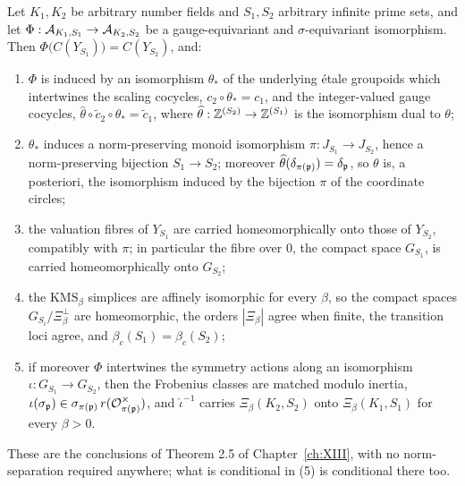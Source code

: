 \begin{theorem}\label{XIV:thm:uncond}
Let $K_1,K_2$ be arbitrary number fields and $S_1,S_2$ arbitrary infinite prime sets, and
let $\Phi:\mathcal{A}_{K_1,S_1}\to\mathcal{A}_{K_2,S_2}$ be a gauge-equivariant and $\sigma$-equivariant
isomorphism. Then $\Phi\bigl(C(Y_{S_1})\bigr)=C(Y_{S_2})$, and:
\begin{enumerate}
\item $\Phi$ is induced by an isomorphism $\theta_*$ of the underlying \'etale groupoids
which intertwines the scaling cocycles, $c_2\circ\theta_*=c_1$, and the integer-valued
gauge cocycles, $\widehat\theta\circ\widetilde c_2\circ\theta_*=\widetilde c_1$, where
$\widehat\theta:\mathbb{Z}^{(S_2)}\to\mathbb{Z}^{(S_1)}$ is the isomorphism dual to $\theta$;
\item $\theta_*$ induces a norm-preserving monoid isomorphism $\pi:J_{S_1}\to J_{S_2}$,
hence a norm-preserving bijection $S_1\to S_2$; moreover
$\widehat\theta(\delta_{\pi(\mathfrak{p})})=\delta_{\mathfrak{p}}$, so $\theta$ is, a posteriori, the
isomorphism induced by the bijection $\pi$ of the coordinate circles;
\item the valuation fibres of $Y_{S_1}$ are carried homeomorphically onto those of
$Y_{S_2}$, compatibly with $\pi$; in particular the fibre over $0$, the compact space
$G_{S_1}$, is carried homeomorphically onto $G_{S_2}$;
\item the $\mathrm{KMS}_\beta$ simplices are affinely isomorphic for every $\beta$, so the
compact spaces $G_{S_i}/\Xi_\beta^\perp$ are homeomorphic, the orders $|\Xi_\beta|$ agree
when finite, the transition loci agree, and $\beta_c(S_1)=\beta_c(S_2)$;
\item if moreover $\Phi$ intertwines the symmetry actions along an isomorphism
$\iota:G_{S_1}\to G_{S_2}$, then the Frobenius classes are matched modulo inertia,
$\iota(\sigma_{\mathfrak{p}})\in\sigma_{\pi(\mathfrak{p})}\,r(\mathcal{O}_{\pi(\mathfrak{p})}^\times)$, and $\hat\iota^{-1}$
carries $\Xi_\beta(K_2,S_2)$ onto $\Xi_\beta(K_1,S_1)$ for every $\beta>0$.
\end{enumerate}
These are the conclusions of Theorem 2.5 of Chapter~\ref{ch:XIII}, with no norm-separation required
anywhere; what is conditional in (5) is conditional there too.
\end{theorem}

